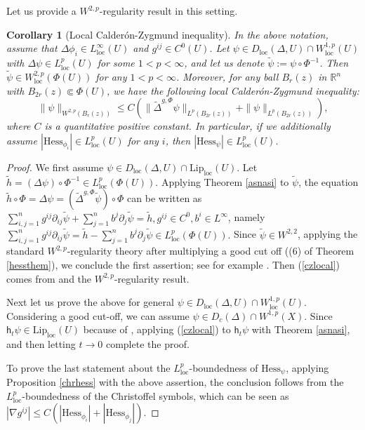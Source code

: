 \documentclass[11pt,reqno]{amsart}
\newtheorem{corollary}[theorem]{Corollary}
\theoremstyle{definition}
\numberwithin{equation}{section}
\DeclareMathOperator{\loc}{loc}
\begin{document}
Let us provide a $W^{2,p}$-regularity result in this setting. 
\begin{corollary}[Local Calder{\'o}n-Zygmund inequality]\label{newcor}
    In the above notation,  assume that $\Delta \phi_i \in L^{\infty}_{\mathrm{loc}}(U)$ and $g^{ij} \in C^0(U)$. Let $\psi\in D_{\loc}(\Delta, U)\cap W^{1,p}_{\loc}(U)$ with $\Delta \psi \in L^p_{\loc}(U)$ for some $1<p<\infty$, 
    and let us denote $\tilde{\psi} := \psi \circ \Phi^{-1}$. Then $\tilde \psi \in W^{2,p}_{\mathrm{loc}}(\Phi(U))$ for any $1 < p<\infty$. 
Moreover,
    for any ball $B_r(z)$ in $\mathbb{R}^n$ with $B_{2r}(z) \Subset \Phi(U)$, we have the following local Calder{\'o}n-Zygmund inequality: 
\begin{equation}\label{czlocal}
    \|\psi\|_{W^{2, p}(B_r(z))}\le C \left( \|\tilde \Delta^{g, \Phi} \psi \|_{L^p(B_{2r}(z))}+\|\psi \|_{L^p(B_{2r}(z))}\right),
\end{equation}
where $C$ is a \textit{quantitative} positive constant. 
In particular, if we additionally assume $|\mathrm{Hess}_{\phi_i}| \in L_{\loc}^p (U)$ for any $i$, then $|\mathrm{Hess}_{\psi}| \in L^{p}_{\mathrm{loc}}(U)$. 
\end{corollary}
\begin{proof}
We first assume $\psi \in D_{\loc}(\Delta, U) \cap \mathrm{Lip}_{\loc}(U)$.
Let $\tilde h=(\Delta \psi)\circ \Phi^{-1} \in L^p_{\loc}(\Phi(U))$.
    Applying Theorem \ref{asnasi} to $\tilde \psi$,  the equation $ \tilde h\circ \Phi=  \Delta \psi= ( \tilde \Delta^{g, \Phi} \tilde{\psi} ) \circ \Phi$ can be written as 
    $
    \sum_{i, j=1}^ng^{ij}\partial_{ij}\tilde \psi+\sum_{j=1}^n b^j\partial_j\tilde \psi=\tilde h, g^{ij} \in C^0, b^i \in L^{\infty}$,
    namely
    $
        \sum_{i, j=1}^ng^{ij}\partial_{ij}\tilde \psi=\tilde h-\sum_{j=1}^nb^j\partial_j\tilde \psi \in L^p_{\loc}(\Phi(U)).
    $
    Since $\tilde{\psi}\in W^{2,2}$,
applying the standard $W^{2,p}$-regularity theory after multiplying a good cut off ((6) of Theorem \ref{hessthem}), we conclude the first assertion; see for example \cite[Theorems 4.1 and 4.2]{CFL}. Then (\ref{czlocal}) comes from \cite[Theorem 9.11]{GT} and the $W^{2,p}$-regularity result.

Next let us prove the above for general $\psi \in D_{\loc}(\Delta, U) \cap W^{1,p}_{\loc}(U)$. Considering a good cut-off, we can assume $\psi \in D_c(\Delta)\cap W^{1,p}(X)$. Since $ \mathsf{h}_t\psi \in \mathrm{Lip}_{\loc}(U)$ because of \cite[Corollary 1.2]{JiangLiZhang}, applying (\ref{czlocal}) to $\mathsf{h}_t\psi$ with Theorem \ref{asnasi}, and then letting $t \to 0$ complete the proof.

To prove the last statement about the $L_{\loc}^p$-boundedness of $\mathrm{Hess}_{\psi}$, applying  Proposition \ref{chrhess} with the above assertion, the conclusion follows from  the $L_{\loc}^p$-boundedness of the  Christoffel symbols, which can be seen as $ |\nabla g^{ij}|\le C(|\mathrm{Hess}_{\phi_i}|+|\mathrm{Hess}_{\phi_j}|)$.
\end{proof}
\end{document}
